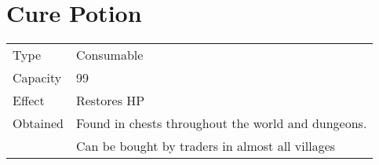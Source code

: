 \section{Cure Potion}
\label{item:cure_potion}


\noindent\begin{tabularx}{\textwidth}[l]{lX}
	Type
	& Consumable
\\
	Capacity
	& 99
\\
	Effect
	& Restores HP
\\
	Obtained
	& Found in chests throughout the world and dungeons. \\
	& Can be bought by traders in almost all villages
\end{tabularx}
